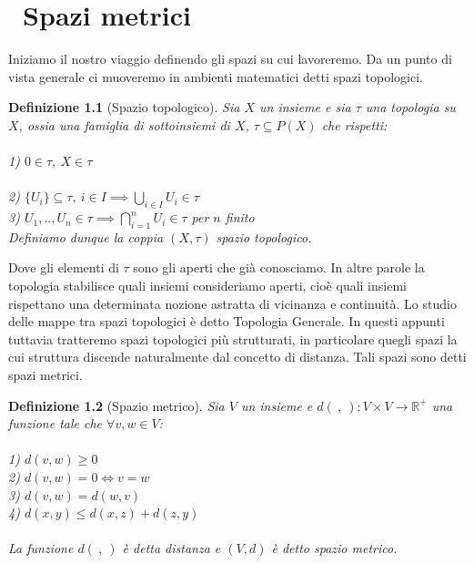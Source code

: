 \documentclass[a4paper,12pt]{report}
\newtheorem{definizione}{Definizione}[chapter]
\begin{document}
\chapter{\ Spazi metrici}

Iniziamo il nostro viaggio definendo gli spazi su cui lavoreremo. Da un punto di vista generale ci muoveremo in ambienti matematici detti spazi topologici.

\begin{definizione}[Spazio topologico]\label{def: 2.1}
    Sia $X$ un insieme e sia $\tau$ una topologia su $X$, ossia una famiglia di sottoinsiemi di $X$, $\tau \subseteq P(X)$ che rispetti:
    \\
    \\ 1) $0 \in \tau,\ X \in \tau$
    \\
    \\ 2) $\{U_i\}\subseteq \tau, \ i \in I \implies\displaystyle\bigcup_{i \in I}U_i \in \tau$
    \\ 3) $U_1,..,U_n \in \tau \implies \displaystyle\bigcap_{i=1}^nU_i\in\tau$ per $n$ finito
    \\
    Definiamo dunque la coppia $(X,\tau)$ spazio topologico.
\end{definizione}

Dove gli elementi di $\tau$ sono gli aperti che già conosciamo. In altre parole la topologia stabilisce quali insiemi consideriamo aperti, cioè quali insiemi rispettano una determinata nozione astratta di vicinanza e continuità. Lo studio delle mappe tra spazi topologici è detto Topologia Generale. In questi appunti tuttavia tratteremo spazi topologici più strutturati, in particolare quegli spazi la cui struttura discende naturalmente dal concetto di distanza. Tali spazi sono detti spazi metrici.

\begin{definizione}[Spazio metrico] \label{def: 2.2}
    Sia $V$ un insieme e $d(\ ,\ ):V \times V \to \mathbb{R}^+$ una funzione tale che $\forall v,w \in V$:
    \\
    \\ 1) $d(v,w) \geq 0$
    \\ 2) $d(v,w)=0 \iff v=w$
    \\ 3) $d(v,w)=d(w,v)$
    \\ 4) $d(x,y) \leq d(x,z)+d(z,y)$
    \\
    \\La funzione $d(\ , \ )$ è detta distanza e $(V,d)$ è detto spazio metrico.
\end{definizione}
\end{document}
